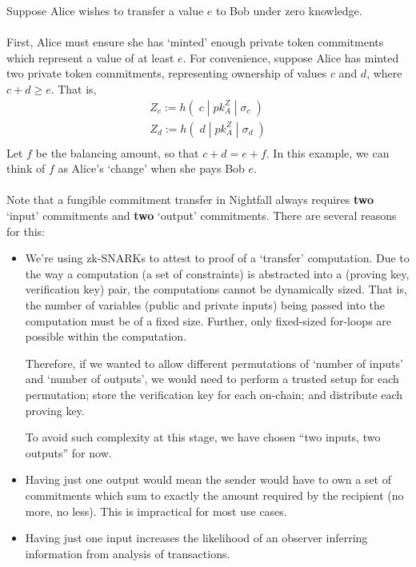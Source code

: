 Suppose Alice wishes to transfer a value $e$ to Bob under zero knowledge.\\
\\
First, Alice must ensure she has `minted' enough private token commitments which represent a value of at least $e$.
For convenience, suppose Alice has minted two private token commitments, representing ownership of values $c$ and $d$, where $c+d \geq e$. That is, 
\begin{align*}
  Z_c := h(\;c\;|\;pk^Z_A\;|\;\sigma_c\;)\\
  Z_d := h(\;d\;|\;pk^Z_A\;|\;\sigma_d\;)\\
\end{align*}
Let $f$ be the balancing amount, so that $c+d = e+f$. In this example, we can think of $f$ as Alice's `change' when she pays Bob $e$.\\
\\
Note that a fungible commitment transfer in Nightfall always requires \textbf{two} `input' commitments and \textbf{two} `output' commitments. There are several reasons for this:
\begin{itemize}
  \item We're using zk-SNARKs to attest to proof of a `transfer' computation. Due to the way a computation (a set of constraints) is abstracted into a (proving key, verification key) pair, the computations cannot be dynamically sized. That is, the number of variables (public and private inputs) being passed into the computation must be of a fixed size. Further, only fixed-sized for-loops are possible within the computation.
  
  Therefore, if we wanted to allow different permutations of `number of inputs' and `number of outputs', we would need to perform a trusted setup for each permutation; store the verification key for each on-chain; and distribute each proving key.

  To avoid such complexity at this stage, we have chosen ``two inputs, two outputs'' for now.

  \item Having just one output would mean the sender would have to own a set of commitments which sum to exactly the amount required by the recipient (no more, no less). This is impractical for most use cases.
  \item Having just one input increases the likelihood of an observer inferring information from analysis of transactions.
\end{itemize}
\ \\

